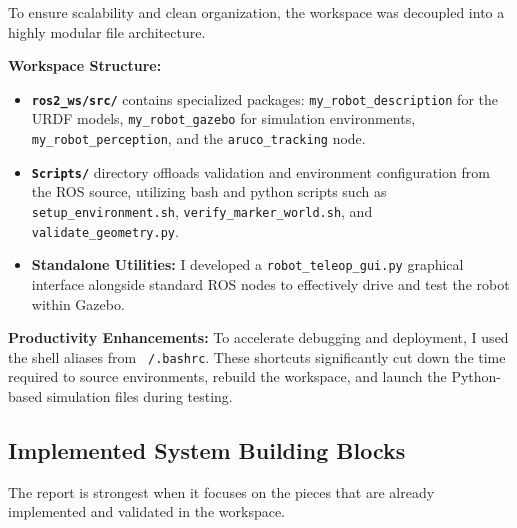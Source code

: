 \documentclass[12pt,a4paper]{article}
\begin{document}
To ensure scalability and clean organization, the workspace was decoupled into a highly modular file architecture. 

\textbf{Workspace Structure:}
\begin{itemize}[leftmargin=*]
    \item \textbf{\texttt{ros2\_ws/src/}} contains specialized packages: \texttt{my\_robot\_description} for the URDF models, \texttt{my\_robot\_gazebo} for simulation environments, \texttt{my\_robot\_perception}, and the \texttt{aruco\_tracking} node. 
    \item \textbf{\texttt{Scripts/}} directory offloads validation and environment configuration from the ROS source, utilizing bash and python scripts such as \texttt{setup\_environment.sh}, \texttt{verify\_marker\_world.sh}, and \texttt{validate\_geometry.py}.
    \item \textbf{Standalone Utilities:} I developed a \texttt{robot\_teleop\_gui.py} graphical interface alongside standard ROS nodes to effectively drive and test the robot within Gazebo.
\end{itemize}

\textbf{Productivity Enhancements:}
To accelerate debugging and deployment, I used the shell aliases from \texttt{~/.bashrc}. These shortcuts significantly cut down the time required to source environments, rebuild the workspace, and launch the Python-based simulation files during testing.

\subsection{Implemented System Building Blocks}

The report is strongest when it focuses on the pieces that are already implemented and validated in the workspace.
\end{document}
